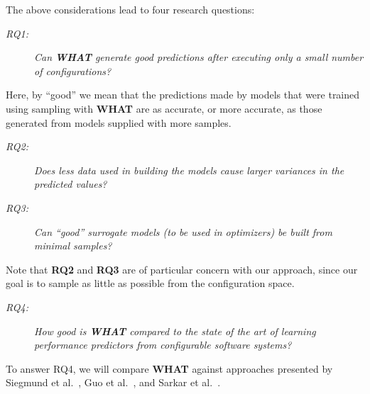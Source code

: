 \documentclass{newsig}
\newcommand{\what}{{\bf WHAT }}
\begin{document}
The above considerations lead to four research questions:
\begin{description}
\item[{\em RQ1:}] {\em Can  \what generate good predictions after
executing only a small number of configurations?}
\end{description}
Here, by ``good'' we mean that the predictions made by models that were trained using sampling with \what are as accurate, or more accurate,
as those generated from models supplied with more samples.
\begin{description}
\item[{\em RQ2:}] {\em
Does less data used in building the models cause larger variances in the predicted values?}
\item[{\em RQ3:}] {\em
Can ``good'' surrogate models (to be used in optimizers)
be built from minimal samples?}
\end{description}
Note that {\bf RQ2} and {\bf RQ3} are of particular concern with our approach,
since our goal is to sample as little as possible from the configuration space.
\begin{description}
\item[{\em RQ4:}] {\em How good is \what compared to the state of the art of
learning performance predictors from configurable software systems?}
\end{description}

To answer RQ4, we will compare \what 
          against approaches presented by Siegmund et al.~\cite{siegmund2012predicting}, Guo et al.~\cite{guo2013variability}, and Sarkar et al.~\cite{sarkar2015cost}.
 
\end{document}
